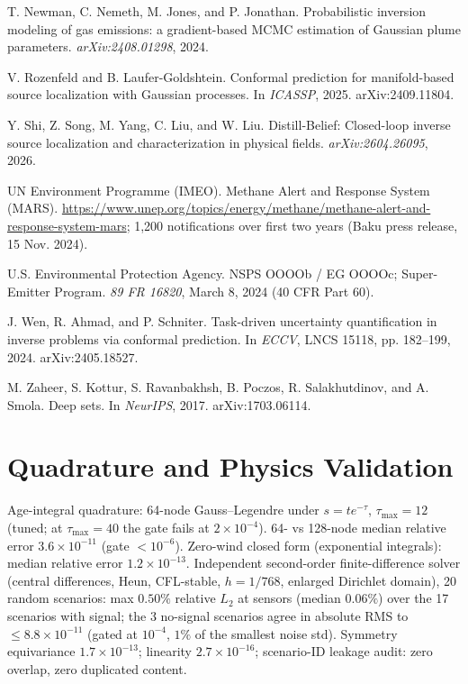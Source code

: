 \documentclass{article}
\begin{document}
{\begin{list}{}{\setlength{\leftmargin}{1.5em}\setlength{\itemindent}{-1.5em}\setlength{\itemsep}{2pt}\setlength{\parsep}{0pt}}
\item T. Newman, C. Nemeth, M. Jones, and P. Jonathan. Probabilistic inversion modeling of gas emissions: a gradient-based MCMC estimation of Gaussian plume parameters. \emph{arXiv:2408.01298}, 2024.
\item V. Rozenfeld and B. Laufer-Goldshtein. Conformal prediction for manifold-based source localization with Gaussian processes. In \emph{ICASSP}, 2025. arXiv:2409.11804.
\item Y. Shi, Z. Song, M. Yang, C. Liu, and W. Liu. Distill-Belief: Closed-loop inverse source localization and characterization in physical fields. \emph{arXiv:2604.26095}, 2026.
\item UN Environment Programme (IMEO). Methane Alert and Response System (MARS). \url{https://www.unep.org/topics/energy/methane/methane-alert-and-response-system-mars}; 1,200 notifications over first two years (Baku press release, 15 Nov. 2024).
\item U.S. Environmental Protection Agency. NSPS OOOOb / EG OOOOc; Super-Emitter Program. \emph{89 FR 16820}, March 8, 2024 (40 CFR Part 60).
\item J. Wen, R. Ahmad, and P. Schniter. Task-driven uncertainty quantification in inverse problems via conformal prediction. In \emph{ECCV}, LNCS 15118, pp. 182--199, 2024. arXiv:2405.18527.
\item M. Zaheer, S. Kottur, S. Ravanbakhsh, B. Poczos, R. Salakhutdinov, and A. Smola. Deep sets. In \emph{NeurIPS}, 2017. arXiv:1703.06114.
\end{list}
}

\appendix

\section{Quadrature and Physics Validation}
\label{app:quadrature}

Age-integral quadrature: 64-node Gauss--Legendre under $s = t e^{-\tau}$,
$\tau_{\max} = 12$ (tuned; at $\tau_{\max}=40$ the gate fails at $2\times10^{-4}$).
64- vs 128-node median relative error $3.6\times10^{-11}$ (gate $<10^{-6}$). Zero-wind
closed form (exponential integrals): median relative error $1.2\times10^{-13}$.
Independent second-order finite-difference solver (central differences, Heun, CFL-stable,
$h = 1/768$, enlarged Dirichlet domain), 20 random scenarios: max $0.50\%$ relative $L_2$
at sensors (median $0.06\%$) over the 17 scenarios with signal; the 3 no-signal scenarios
agree in absolute RMS to $\leq 8.8\times10^{-11}$ (gated at $10^{-4}$, $1\%$ of the
smallest noise std). Symmetry equivariance $1.7\times10^{-13}$; linearity
$2.7\times10^{-16}$; scenario-ID leakage audit: zero overlap, zero duplicated content.
\end{document}
